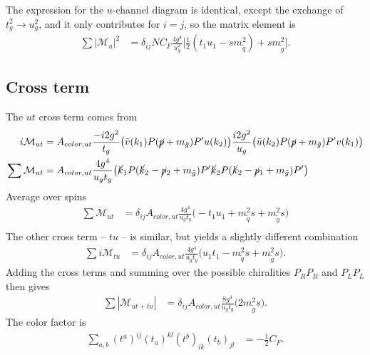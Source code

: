 \documentclass[11pt]{article}
\begin{document}
\begin{flushleft}
The expression for the $u$-channel diagram is identical, except the exchange of $t_g^2 \rightarrow u_g^2$, and it only contributes for $i =j$, so the matrix element is
\begin{align*}
\sum |\mathcal{M}_u|^2 &= \delta_{ij} NC_F \frac{4g^4}{u_g^2} \Big[ \frac{1}{2}(t_1u_1-sm_{\tilde{q}}^2) + sm_{\tilde{g}}^2 \Big]. 
\end{align*}
\end{flushleft}

\subsection*{Cross term}
\begin{flushleft}
The $ut$ cross term comes from
\begin{align*}
i \mathcal{M}_{ut} &= A_{color, ut}\frac{-i 2 g^2}{t_g}\big( \bar{v} (k_1)  P (\cancel{p} + m_{\tilde{g}}) P'u(k_2) \big)  \frac{i 2 g^2}{u_g} \big( \bar{u} (k_2)  P (\cancel{p} + m_{\tilde{g}}) P' v(k_1) \big)\\
\sum \mathcal{M}_{ut} &= A_{color, ut} \frac{4 g^4}{u_gt_g}\big( \cancel{k}_1   P (\cancel{k}_2 - \cancel{p}_2 + m_{\tilde{g}}) P'\cancel{k}_2  P (\cancel{k}_2 -\cancel{p}_1 + m_{\tilde{g}}) P' \big)\\
\end{align*}
Average over spins
\begin{align*}
\sum  \mathcal{M}_{ut} 
  &= \delta_{ij} A_{color, ut} \frac{4 g^4}{u_gt_g} \big(
  -   t_1 u_1 + m_{\tilde{q}}^2 s 
+  m_{\tilde{g}}^2 s
  \big)\\
\end{align*}
The other cross term --  $tu$ -- is similar, but yields a slightly different combination
\begin{align*}
\sum i \mathcal{M}_{tu} 
  &= \delta_{ij} A_{color, ut} \frac{4 g^4}{u_gt_g} \big(
u_1t_1- m_{\tilde{q}}^2s + m_{\tilde{g}}^2s
  \big).
\end{align*}
Adding the cross terms and summing over the possible chiralities $P_RP_R$ and $P_LP_L$ then gives 
\begin{align*}
\sum |\mathcal{M}_{ut+tu}| &= \delta_{ij} A_{color, ut} \frac{8 g^4}{u_gt_g} \big(2 m_{\tilde{g}}^2s   \big).
\end{align*}
The color factor is
\begin{align*}
\sum_{a,b}(t^a)^{ij}(t_a)^{kl}(t^b)_{ik}(t_b)_{jl} 
 &= - \frac{1}{2}C_F.
\end{align*}
\end{flushleft}
\end{document}
